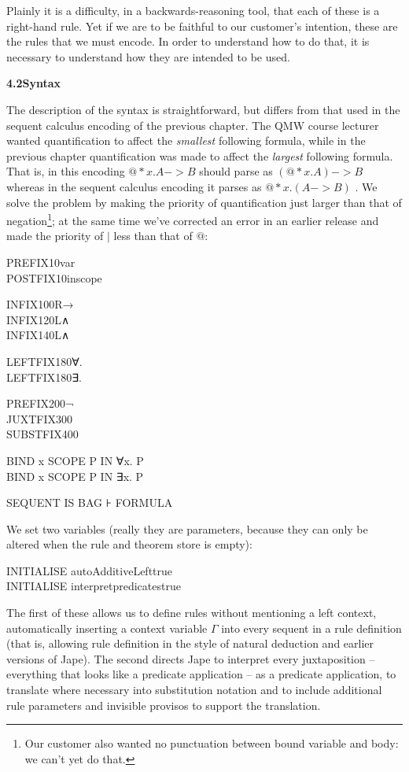 \documentclass[11pt]{book}
\newcommand{\tab}{\hspace{5mm}}
\begin{document}
Plainly it is a difficulty, in a backwards-reasoning tool, that each of these is a right-hand rule. Yet if we are to be faithful to our customer's intention, these are the rules that we must encode. In order to understand how to do that, it is necessary to understand how they are intended to be used.


\textbf{{\large 4.2\tab Syntax}}


The description of the syntax is straightforward, but differs from that used in the sequent calculus encoding of the previous chapter. The QMW course lecturer wanted quantification to affect the \textit{smallest} following formula, while in the previous chapter quantification was made to affect the \textit{largest} following formula. That is, in this encoding $@*x.A->B$ should parse as $\left( @*x.A\right) ->B$ whereas in the sequent calculus encoding it parses as $@*x.\left( A->B\right) $ . We solve the problem by making the priority of quantification just larger than that of negation\footnote{Our customer also wanted no punctuation between bound variable and body: we can't yet do that.}; at the same time we've corrected an error in an earlier release and made the priority of \ensuremath{|} less than that of \ensuremath{@}:

PREFIX\tab 10\tab var\\
POSTFIX\tab 10\tab inscope

INFIX\tab 100R\tab →\\
INFIX\tab 120L\tab ∧\\
INFIX\tab 140L\tab ∧

LEFTFIX\tab 180\tab ∀.\\
LEFTFIX\tab 180\tab ∃.

PREFIX\tab 200\tab ¬\\
JUXTFIX\tab 300\\
SUBSTFIX\tab 400 

BIND x SCOPE P IN ∀x. P\\
BIND x SCOPE P IN ∃x. P

SEQUENT IS BAG ⊦ FORMULA


We set two variables (really they are parameters, because they can only be altered when the rule and theorem store is empty):

INITIALISE autoAdditiveLeft\tab true \\
INITIALISE interpretpredicates\tab true


The first of these allows us to define rules without mentioning a left context, automatically inserting a context variable \ensuremath{\Gamma} into every sequent in a rule definition (that is, allowing rule definition in the style of natural deduction and earlier versions of Jape). The second directs Jape to interpret every juxtaposition -- everything that looks like a predicate application -- as a predicate application, to translate where necessary into substitution notation and to include additional rule parameters and invisible provisos to support the translation.
\end{document}
